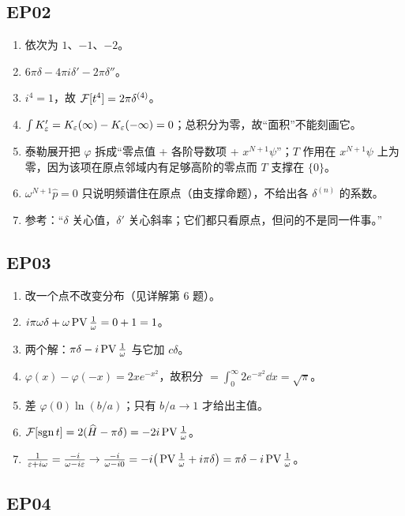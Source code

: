 \subsection*{EP02}

\begin{enumerate}[leftmargin=1.8em,itemsep=0.3em]
\item 依次为 $1$、$-1$、$-2$。
\item $6\pi\delta-4\pi i\delta'-2\pi\delta''$。
\item $i^{4}=1$，故 $\mathcal{F}[t^{4}]=2\pi\delta^{(4)}$。
\item $\int K_\varepsilon'=K_\varepsilon(\infty)-K_\varepsilon(-\infty)=0$；总积分为零，故“面积”不能刻画它。
\item 泰勒展开把 $\varphi$ 拆成“零点值 + 各阶导数项 + $x^{N+1}\psi$”；$T$ 作用在 $x^{N+1}\psi$ 上为零，因为该项在原点邻域内有足够高阶的零点而 $T$ 支撑在 $\{0\}$。
\item $\omega^{N+1}\widehat p=0$ 只说明频谱住在原点（由支撑命题），不给出各 $\delta^{(n)}$ 的系数。
\item 参考：“$\delta$ 关心值，$\delta'$ 关心斜率；它们都只看原点，但问的不是同一件事。”
\end{enumerate}

\subsection*{EP03}

\begin{enumerate}[leftmargin=1.8em,itemsep=0.3em]
\item 改一个点不改变分布（见详解第 6 题）。
\item $i\pi\omega\delta+\omega\operatorname{PV}\frac1\omega=0+1=1$。
\item 两个解：$\pi\delta-i\operatorname{PV}\frac1\omega$ 与它加 $c\delta$。
\item $\varphi(x)-\varphi(-x)=2xe^{-x^{2}}$，故积分 $=\int_0^\infty2e^{-x^{2}}\dd x=\sqrt\pi$。
\item 差 $\varphi(0)\ln(b/a)$；只有 $b/a\to1$ 才给出主值。
\item $\mathcal{F}[\operatorname{sgn} t]=2(\widehat H-\pi\delta)=-2i\operatorname{PV}\frac1\omega$。
\item $\frac{1}{\varepsilon+i\omega}=\frac{-i}{\omega-i\varepsilon}\to\frac{-i}{\omega-i0}=-i\big(\operatorname{PV}\frac1\omega+i\pi\delta\big)=\pi\delta-i\operatorname{PV}\frac1\omega$。
\end{enumerate}

\subsection*{EP04}

